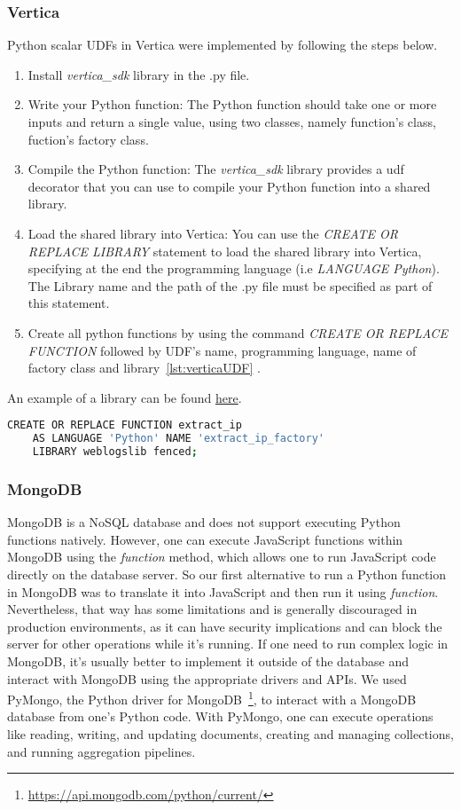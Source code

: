 \subsubsection{Vertica}
Python scalar UDFs in Vertica were implemented by following the steps below. 
\begin{enumerate}
	\item Install \emph{vertica\_sdk} library in the .py file.
	\item Write your Python function: The Python function should take 
	one or more inputs and return a single value, using two classes, namely
	function's class, fuction's factory class.
	\item Compile the Python function: The \emph{vertica\_sdk} library provides 
	a udf decorator that you can use to compile your Python function into a shared library.
	\item Load the shared library into Vertica: You can use the 
	\emph{CREATE OR REPLACE LIBRARY} statement to load the shared library into Vertica, 
	specifying at the end the programming language (i.e \emph{LANGUAGE Python}).
	The Library name and the path of the .py file must be specified as part of this statement.
	\item Create all python functions by using the command \emph{CREATE OR REPLACE FUNCTION}
	followed by UDF's name, programming language, name of factory class and library~\ref{lst:verticaUDF} .
\end{enumerate}
An example of a library can be found 
\href{https://www.vertica.com/docs/9.2.x/HTML/Content/Authoring/ExtendingVertica/UDx/ScalarFunctions/Python/PythonExampleAdd2Ints.htm}{here}.
\begin{lstlisting}[language=sh, caption={Example of UDF in Vertica},label={lst:verticaUDF}] 
	CREATE OR REPLACE FUNCTION extract_ip 
	AS LANGUAGE 'Python' NAME 'extract_ip_factory' 
	LIBRARY weblogslib fenced;
\end{lstlisting}

\subsubsection{MongoDB}
MongoDB is a NoSQL database and does not support executing Python functions
natively. 
However, one can execute JavaScript functions within MongoDB using the 
\emph {function} 
method, which allows one to run JavaScript code directly on the database server.
So our first alternative to run a Python function in MongoDB was to
translate it into JavaScript and then run it using \emph{function}. 
Nevertheless, that way has some limitations and is generally discouraged in production environments, 
as it can have security implications and can block the server for other operations while it's running. 
If one need to run complex logic in MongoDB, 
it's usually better to implement it outside of the database and interact with MongoDB 
using the appropriate drivers and APIs.
We used PyMongo, the Python driver for MongoDB~\footnote{\url{https://api.mongodb.com/python/current/}},
to interact with a MongoDB database from one's Python code. 
With PyMongo, one can execute operations like reading, writing, and updating documents, 
creating and managing collections, and running aggregation pipelines.


